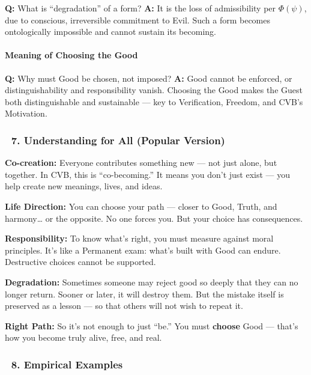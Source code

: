 \documentclass[12pt]{article}
\begin{document}
\textbf{Q:} What is ``degradation'' of a form?  
\textbf{A:} It is the loss of admissibility per $\Phi(\psi)$, due to conscious, irreversible commitment to Evil. Such a form becomes ontologically impossible and cannot sustain its becoming.

\paragraph{Meaning of Choosing the Good}

\textbf{Q:} Why must Good be chosen, not imposed?  
\textbf{A:} Good cannot be enforced, or distinguishability and responsibility vanish. Choosing the Good makes the Guest both distinguishable and sustainable — key to Verification, Freedom, and CVB’s Motivation.

\subsubsection*{🔹 7. Understanding for All (Popular Version)}

\textbf{Co-creation:} Everyone contributes something new — not just alone, but together. In CVB, this is ``co-becoming.'' It means you don’t just exist — you help create new meanings, lives, and ideas.

\textbf{Life Direction:} You can choose your path — closer to Good, Truth, and harmony… or the opposite. No one forces you. But your choice has consequences.

\textbf{Responsibility:} To know what’s right, you must measure against moral principles. It’s like a Permanent exam: what’s built with Good can endure. Destructive choices cannot be supported.

\textbf{Degradation:} Sometimes someone may reject good so deeply that they can no longer return. Sooner or later, it will destroy them. But the mistake itself is preserved as a lesson — so that others will not wish to repeat it.

\textbf{Right Path:} So it’s not enough to just ``be.'' You must \textbf{choose} Good — that’s how you become truly alive, free, and real.

\subsubsection*{🔹 8. Empirical Examples}
\end{document}
